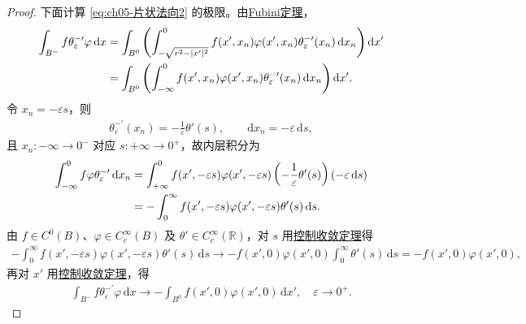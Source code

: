 \documentclass[../../main.tex]{subfiles}
\begin{document}
\begin{proof}
下面计算 \eqref{eq:ch05-片状法向2} 的极限。由\hyperref[Real Analysis-theorem:实变函数-Fubini定理]{Fubini定理}，
\begin{align}
\int_{B^{-}}f\theta_{\varepsilon}^{-\prime}\varphi\,\mathrm{d}x
&=\int_{B^{0}}\left(\int_{-\sqrt{r^{2}-|x'|^{2}}}^{0}f(x',x_n)\varphi(x',x_n)\theta_{\varepsilon}^{-\prime}(x_n)\,\mathrm{d}x_n\right)\mathrm{d}x'
\notag\\
&=\int_{B^{0}}\left(\int_{-\infty}^{0}f(x',x_n)\varphi(x',x_n)\theta_{\varepsilon}^{-\prime}(x_n)\,\mathrm{d}x_n\right)\mathrm{d}x'.
\label{eq:ch05-法向负内层}
\end{align}
令 $x_n=-\varepsilon s$，则
\begin{align*}
\theta_{\varepsilon}^{-\prime}(x_n)=-\frac{1}{\varepsilon}\theta'(s),\qquad \mathrm{d}x_n=-\varepsilon\,\mathrm{d}s,
\end{align*}
且 $x_n:-\infty\to0^{-}$ 对应 $s:+\infty\to0^{+}$，故内层积分为
\begin{align}
\int_{-\infty}^{0}f\varphi\theta_{\varepsilon}^{-\prime}\,\mathrm{d}x_n
&=\int_{+\infty}^{0}f(x',-\varepsilon s)\varphi(x',-\varepsilon s)\left(-\frac{1}{\varepsilon}\theta'(s)\right)(-\varepsilon\,\mathrm{d}s)
\notag\\
&=-\int_{0}^{\infty}f(x',-\varepsilon s)\varphi(x',-\varepsilon s)\theta'(s)\,\mathrm{d}s.
\label{eq:ch05-法向负内层2}
\end{align}
由 $f\in C^{0}(B)$、$\varphi\in C_{c}^{\infty}(B)$ 及 $\theta'\in C_{c}^{\infty}(\mathbb{R})$，对 $s$ 用\hyperref[Real Analysis-theorem:控制收敛定理]{控制收敛定理}得
\begin{align*}
-\int_{0}^{\infty}f(x',-\varepsilon s)\varphi(x',-\varepsilon s)\theta'(s)\,\mathrm{d}s
\longrightarrow-f(x',0)\varphi(x',0)\int_{0}^{\infty}\theta'(s)\,\mathrm{d}s
=-f(x',0)\varphi(x',0),
\end{align*}
再对 $x'$ 用\hyperref[Real Analysis-theorem:控制收敛定理]{控制收敛定理}，得
\begin{align}
\int_{B^{-}}f\theta_{\varepsilon}^{-\prime}\varphi\,\mathrm{d}x
\longrightarrow-\int_{B^{0}}f(x',0)\varphi(x',0)\,\mathrm{d}x',\quad\varepsilon\to0^{+}.
\label{eq:ch05-法向负极限}
\end{align}


\end{proof}
\end{document}
